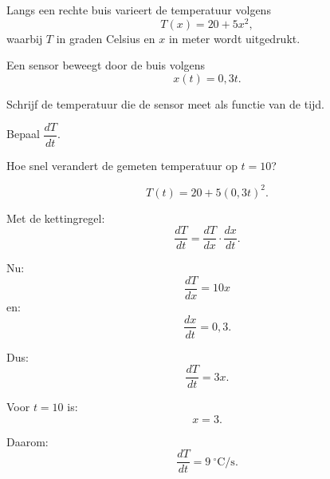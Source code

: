 \documentclass{ximera}
\begin{document}
\begin{oefening}{\oefU\ESS}

Langs een rechte buis varieert de temperatuur volgens
\[
T(x)=20+5x^2,
\]
waarbij $T$ in graden Celsius en $x$ in meter wordt uitgedrukt.

Een sensor beweegt door de buis volgens
\[
x(t)=0{,}3t.
\]

\begin{question}
Schrijf de temperatuur die de sensor meet als functie van de tijd.
\end{question}

\begin{question}
Bepaal $\dfrac{dT}{dt}$.
\end{question}

\begin{question}
Hoe snel verandert de gemeten temperatuur op $t=10$?
\end{question}

\begin{oplossing}

\[
T(t)=20+5(0{,}3t)^2.
\]

Met de kettingregel:
\[
\frac{dT}{dt}
=
\frac{dT}{dx}\cdot\frac{dx}{dt}.
\]

Nu:
\[
\frac{dT}{dx}=10x
\]
en:
\[
\frac{dx}{dt}=0{,}3.
\]

Dus:
\[
\frac{dT}{dt}=3x.
\]

Voor $t=10$ is:
\[
x=3.
\]

Daarom:
\[
\boxed{\frac{dT}{dt}=9\ ^\circ\mathrm{C/s}.}
\]

\end{oplossing}

\end{oefening}
\end{document}
